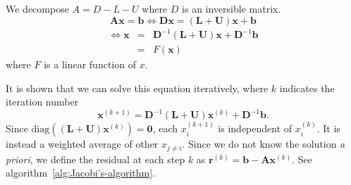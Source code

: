 We decompose $A=D-L-U$ where $D$ is an inversible matrix.
\begin{equation}
\bm{A}\bm{x}=\bm{b}\Leftrightarrow\bm{D}\bm{x}=\left(\bm{L}+\bm{U}\right)\bm{x}+\bm{b}
\end{equation}
\begin{eqnarray}
\Leftrightarrow\bm{x} & = & \bm{D}^{-1}\left(\bm{L}+\bm{U}\right)\bm{x}+\bm{D}^{-1}\bm{b}\\
 & = & F\left(\bm{x}\right)
\end{eqnarray}
where $F$ is a linear function of $x$.

It is shown that we can solve this equation iteratively,
where $k$ indicates the iteration number
\begin{equation}
\bm{x}^{\left(k+1\right)}=\bm{D}^{-1}\left(\bm{L}+\bm{U}\right)\bm{x}^{\left(k\right)}+\bm{D}^{-1}\bm{b}.
\end{equation}
Since $\mbox{diag}\left(\left(\bm{L}+\bm{U}\right)\bm{x}^{\left(k\right)}\right)=\bm{0}$,
each $x_{i}^{\left(k+1\right)}$ is independent of $x_{i}^{\left(k\right)}$.
It is instead a weighted average of other $x_{j\neq i}$. Since we
do not know the solution \emph{a priori}, we define the residual at
each step $k$ as $\bm{r}^{\left(k\right)}=\bm{b}-\bm{A}\bm{x}^{\left(k\right)}$.
See algorithm~\ref{alg:Jacobi's-algorithm}.

